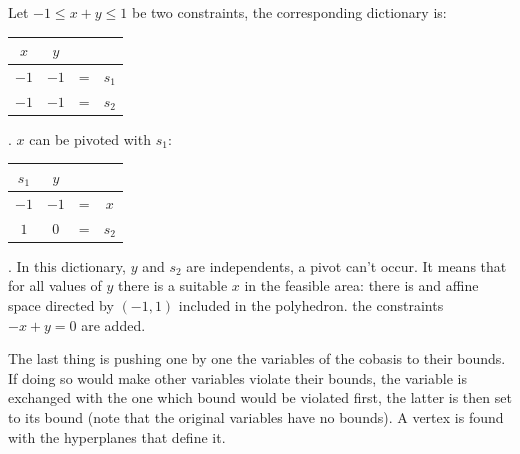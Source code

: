 \begin{example} 
\begin{multicols}{2}
Let $-1\leq x+y\leq 1$ be two constraints, the corresponding dictionary is:
\begin{tabular}{| c | c || c c |}
\hline	
$x$ & $y$ & & \\
\hline
\hline	
$-1$ & $-1$ & = & $s_1$\\ \hline	
$-1$ & $-1$ & = & $s_2$\\ \hline 
\end{tabular}. $x$ can be pivoted with $s_1$:
\begin{tabular}{| c | c || c c |}
\hline	
$s_1$ & $y$ & & \\
\hline
\hline	
$-1$ & $-1$ & = & $x$\\ \hline	
$1$ & $0$ & = & $s_2$\\ \hline 
\end{tabular}. In this dictionary, $y$ and $s_2$ are independents, a pivot can't occur. It means that for all values of $y$ there is a suitable $x$ in the feasible area: there is and affine space directed by $(-1,1)$ included in the polyhedron. the constraints $-x+y=0$ are added.

\columnbreak

\end{multicols}
\label{ex_detect_linalty}
\end{example}

The last thing is pushing one by one the variables of the cobasis to their bounds. If doing so would make other variables violate their bounds, the variable is exchanged with the one which bound would be violated first, the latter is then set to its bound (note that the original variables have no bounds). A vertex is found with the hyperplanes that define it.

